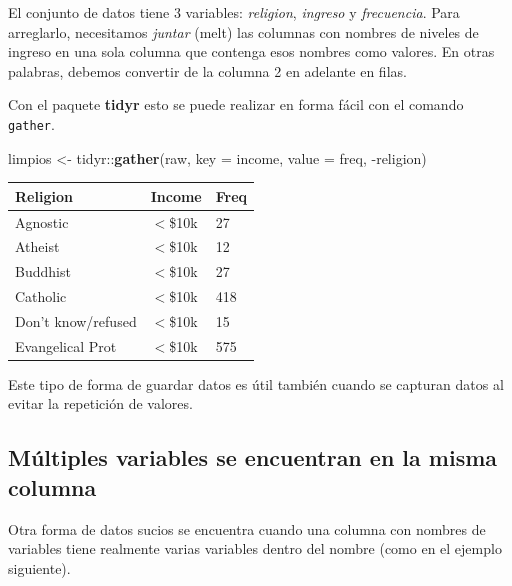 \documentclass[]{article}
\newenvironment{Shaded}{\begin{snugshade}}{\end{snugshade}}
\newcommand{\KeywordTok}[1]{\textcolor[rgb]{0.13,0.29,0.53}{\textbf{{#1}}}}
\newcommand{\DataTypeTok}[1]{\textcolor[rgb]{0.13,0.29,0.53}{{#1}}}
\newcommand{\StringTok}[1]{\textcolor[rgb]{0.31,0.60,0.02}{{#1}}}
\newcommand{\NormalTok}[1]{{#1}}
\begin{document}
El conjunto de datos tiene 3 variables: \emph{religion}, \emph{ingreso}
y \emph{frecuencia}. Para arreglarlo, necesitamos \emph{juntar} (melt)
las columnas con nombres de niveles de ingreso en una sola columna que
contenga esos nombres como valores. En otras palabras, debemos convertir
de la columna 2 en adelante en filas.

Con el paquete \textbf{tidyr} esto se puede realizar en forma fácil con
el comando \texttt{gather}.

\begin{Shaded}
\begin{Highlighting}[]
\NormalTok{limpios <-}\StringTok{ }\NormalTok{tidyr::}\KeywordTok{gather}\NormalTok{(raw, }\DataTypeTok{key =} \NormalTok{income, }\DataTypeTok{value =} \NormalTok{freq, -religion)}
\end{Highlighting}
\end{Shaded}

\begin{table}[ht]
\centering
\begin{tabular}{lll}
  \hline
Religion & Income & Freq \\ 
  \hline
Agnostic & $<$\$10k & 27 \\ 
  Atheist & $<$\$10k & 12 \\ 
  Buddhist & $<$\$10k & 27 \\ 
  Catholic & $<$\$10k & 418 \\ 
  Don’t know/refused & $<$\$10k & 15 \\ 
  Evangelical Prot & $<$\$10k & 575 \\ 
   \hline
\end{tabular}
\end{table}

Este tipo de forma de guardar datos es útil también cuando se capturan
datos al evitar la repetición de valores.

\subsection{Múltiples variables se encuentran en la misma
columna}\label{multiples-variables-se-encuentran-en-la-misma-columna}

Otra forma de datos sucios se encuentra cuando una columna con nombres
de variables tiene realmente varias variables dentro del nombre (como en
el ejemplo siguiente).
\end{document}
